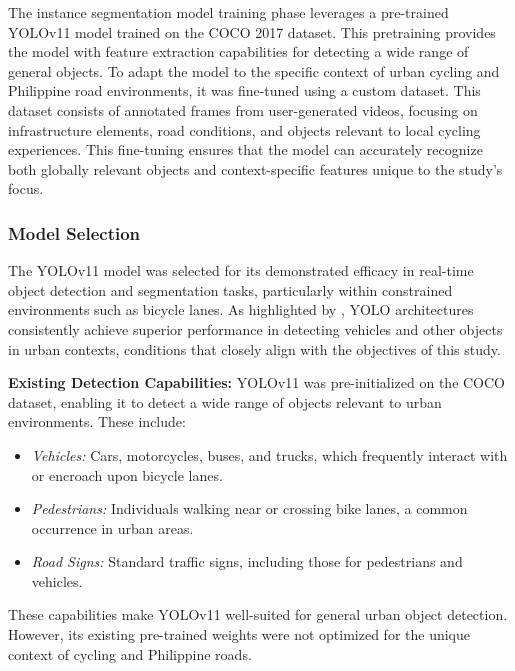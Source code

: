 The instance segmentation model training phase leverages a pre-trained YOLOv11 model trained on the COCO 2017 dataset. This pretraining provides the model with feature extraction capabilities for detecting a wide range of general objects. To adapt the model to the specific context of urban cycling and Philippine road environments, it was fine-tuned using a custom dataset. This dataset consists of annotated frames from user-generated videos, focusing on infrastructure elements, road conditions, and objects relevant to local cycling experiences. This fine-tuning ensures that the model can accurately recognize both globally relevant objects and context-specific features unique to the study's focus.

\subsubsection{Model Selection}
The YOLOv11 model was selected for its demonstrated efficacy in real-time object detection and segmentation tasks, particularly within constrained environments such as bicycle lanes. As highlighted by \citet{GarciaPajuelo2024}, YOLO architectures consistently achieve superior performance in detecting vehicles and other objects in urban contexts, conditions that closely align with the objectives of this study.

\textbf{Existing Detection Capabilities:} YOLOv11 was pre-initialized on the COCO dataset, enabling it to detect a wide range of objects relevant to urban environments. These include:
\begin{itemize}
    \item \textit{Vehicles:} Cars, motorcycles, buses, and trucks, which frequently interact with or encroach upon bicycle lanes.
    \item \textit{Pedestrians:} Individuals walking near or crossing bike lanes, a common occurrence in urban areas.
    \item \textit{Road Signs:} Standard traffic signs, including those for pedestrians and vehicles.
\end{itemize}

These capabilities make YOLOv11 well-suited for general urban object detection. However, its existing pre-trained weights were not optimized for the unique context of cycling and Philippine roads.

